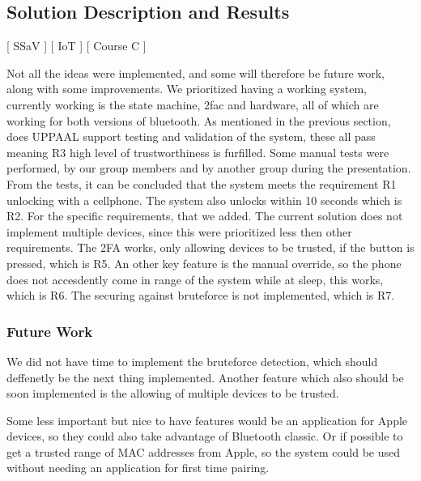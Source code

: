 \subsection{Solution Description and Results}
[ SSaV ] [ IoT ] [ Course C ] 
\newline
[ Casper ] [ Phu ] [ Simon ] 
\newline
\begin{comment}
The solution provides the functionality of connecting with bluetooth to the ESP, if the bluetooth connection is recognized as a trusted device, it will allow the user to enter. While it is also possible to open up the door with the potentiometer in case that the bluetooth is unable to connect, the idea is that malfunctions could happen and the user would still need access to their house and or belongings. If it were the case that non of the intended methods to gain entry is used, the bluetooth connection and potentiometer, an alarm will be set of as it would then be considered a forced entry.
\end{comment}

Not all the ideas were implemented, and some will therefore be future work, along with some improvements.
We prioritized having a working system, currently working is the state machine, 2fac and hardware, all of which are working for both versions of bluetooth.
As mentioned in the previous section, does UPPAAL support testing and validation of the system, these all pass meaning R3 high level of trustworthiness is furfilled.
Some manual tests were performed, by our group members and by another group during the presentation.
From the tests, it can be concluded that the system meets the requirement R1 unlocking with a cellphone.
The system also unlocks within 10 seconds which is R2.
For the specific requirements, that we added.
The current solution does not implement multiple devices, since this were prioritized less then other requirements.
The 2FA works, only allowing devices to be trusted, if the button is pressed, which is R5.
An other key feature is the manual override, so the phone does not accesdently come in range of the system while at sleep, this works, which is R6.
The securing against bruteforce is not implemented, which is R7.

\subsubsection{Future Work}
We did not have time to implement the bruteforce detection, which should deffenetly be the next thing implemented. Another feature which also should be soon implemented is the allowing of multiple devices to be trusted.

Some less important but nice to have features would be an application for Apple devices, so they could also take advantage of Bluetooth classic.
Or if possible to get a trusted range of MAC addresses from Apple, so the system could be used without needing an application for first time pairing.

